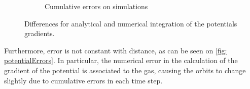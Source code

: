 \begin{figure}[h]
\begin{subfigure}[t]{0.49\textwidth}
				\caption{Cumulative errors on simulations}
				\label{fig: simulationErrors}
			\end{subfigure}
			\caption{Differences for analytical and numerical integration of the potentials gradients.}
			\label{fig: numericalErrors}
		\end{figure}
	
		Furthermore, error is not constant with distance, as can be seen on \autoref{fig: potentialErrors}. In particular, the numerical error in the calculation of the gradient of the potential is associated to the gas, causing the orbits to change slightly due to cumulative errors in each time step.